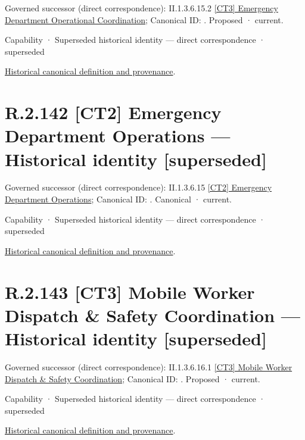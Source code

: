 {\small Governed successor (direct correspondence): II.1.3.6.15.2 \hyperref[element:8f0b0f3d9e8d44a7827b0835870b4a4f]{[CT3] Emergency Department Operational Coordination}; Canonical ID: \texttt{}. Proposed · current.}\par
\label{element:15b6d2518e60444098b7c546ca31c49b}
{\small Capability · Superseded historical identity — direct correspondence · superseded}\par
\href{../../../../../../../continuum/strategy/capability/15b6d2518e60444098b7c546ca31c49b.md}{Historical canonical definition and provenance}.\par
\section*{R.2.142 [CT2] Emergency Department Operations — Historical identity [superseded]}
\label{navigation:R.2.142}

{\small Governed successor (direct correspondence): II.1.3.6.15 \hyperref[element:24a4b5815faa4d369bc756a6e97d3e9e]{[CT2] Emergency Department Operations}; Canonical ID: \texttt{}. Canonical · current.}\par
\label{element:8963b571e9cc40e49c5d738e31d2f97e}
{\small Capability · Superseded historical identity — direct correspondence · superseded}\par
\href{../../../../../../../continuum/strategy/capability/8963b571e9cc40e49c5d738e31d2f97e.md}{Historical canonical definition and provenance}.\par
\section*{R.2.143 [CT3] Mobile Worker Dispatch \& Safety Coordination — Historical identity [superseded]}
\label{navigation:R.2.143}

{\small Governed successor (direct correspondence): II.1.3.6.16.1 \hyperref[element:d72164668dfe448bbebe74e9e1a75233]{[CT3] Mobile Worker Dispatch \& Safety Coordination}; Canonical ID: \texttt{}. Proposed · current.}\par
\label{element:5aafd1f4bff046b2b532c20dfb191473}
{\small Capability · Superseded historical identity — direct correspondence · superseded}\par
\href{../../../../../../../continuum/strategy/capability/5aafd1f4bff046b2b532c20dfb191473.md}{Historical canonical definition and provenance}.\par
